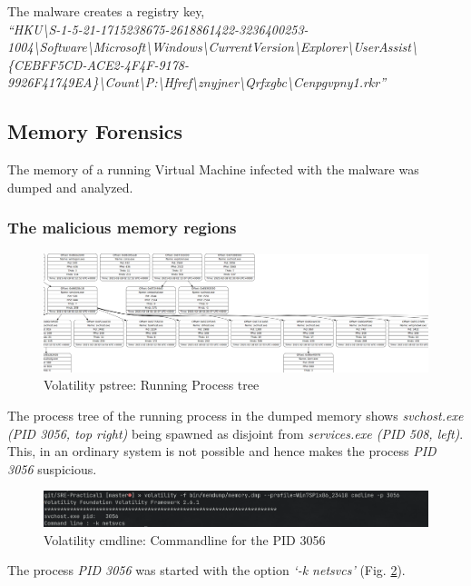 \documentclass[10pt,a4paper]{article}
\begin{document}
					The malware creates a registry key,\\
						\textit{``HKU\textbackslash S-1-5-21-1715238675-2618861422-3236400253-1004\textbackslash Software\textbackslash Microsoft\textbackslash Windows\textbackslash CurrentVersion\textbackslash Explorer\textbackslash UserAssist\textbackslash\{CEBFF5CD-ACE2-4F4F-9178-9926F41749EA\}\textbackslash Count\textbackslash P:\textbackslash Hfref\textbackslash znyjner\textbackslash Qrfxgbc\textbackslash Cenpgvpny1.rkr''}

		\subsection{Memory Forensics}
				The memory of a running Virtual Machine infected with the malware was dumped and analyzed.
				\subsubsection{The malicious memory regions}
					\begin{figure}[!htbp]%
						\centering
						\includegraphics[width=\columnwidth]{pics/pstree.png}
						\caption{Volatility pstree: Running Process tree}
						\label{pstree}
					\end{figure}
					The process tree of the running process in the dumped memory shows \textit{svchost.exe (PID 3056, top right)}
					being spawned as disjoint from \textit{services.exe (PID 508, left)}. This, in an ordinary system is not
					possible and hence makes the process \textit{PID 3056} suspicious.

					\begin{figure}[!htbp]%
						\centering
						\includegraphics[width=\columnwidth]{pics/svchost_cmdline.png}
						\caption{Volatility cmdline: Commandline for the PID 3056}
						\label{svchostCmdline}
					\end{figure}
					The process \textit{PID 3056} was started with the option \textit{`-k netsvcs'} (Fig. \ref{svchostCmdline}).
\end{document}
